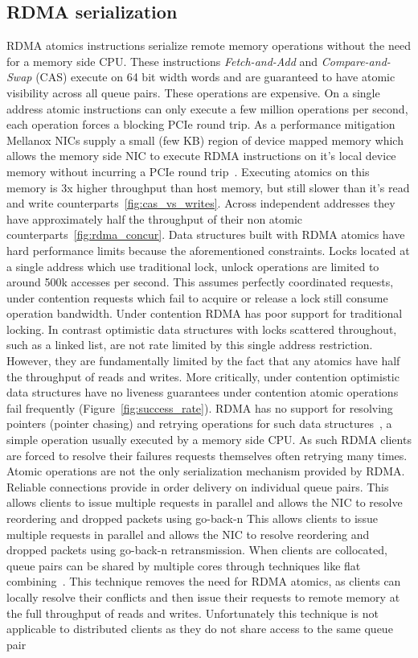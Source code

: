\subsection{RDMA serialization} RDMA atomics instructions
serialize remote memory operations without the need for a
memory side CPU. These instructions \textit{Fetch-and-Add}
and \textit{Compare-and-Swap} (CAS) execute on 64 bit width
words and are guaranteed to have atomic visibility across
all queue pairs. These operations are expensive. On a single
address atomic instructions can only execute a few million
operations per second, each operation forces a blocking PCIe
round trip.  As a performance mitigation Mellanox NICs
supply a small (few KB) region of device mapped memory which
allows the memory side NIC to execute RDMA instructions on
it's local device memory without incurring a PCIe round
trip~\cite{sherman}. Executing atomics on this memory is 3x higher
throughput than host memory, but still slower than it's read
and write counterparts~\ref{fig:cas_vs_writes}.  Across
independent addresses they have approximately half the
throughput of their non atomic
counterparts~\ref{fig:rdma_concur}. 
Data structures built with RDMA atomics have hard
performance limits because the aforementioned constraints.
Locks located at a single address which use traditional
lock, unlock operations are limited to around 500k accesses
per second. This assumes perfectly coordinated requests,
under contention requests which fail to acquire or release a
lock still consume operation bandwidth.
Under contention RDMA has poor support for traditional
locking. In contrast optimistic data structures with locks
scattered throughout, such as a linked list, are not rate
limited by this single address restriction.  However, they
are fundamentally limited by the fact that any atomics have
half the throughput of reads and writes. More critically,
under contention optimistic data structures have no liveness
guarantees under contention atomic operations fail
frequently (Figure~\ref{fig:success_rate}).  RDMA has no
support for resolving pointers (pointer chasing) and
retrying operations for such data structures~\cite{rma,snap,prism}, a
simple operation usually executed by a memory side CPU. As
such RDMA clients are forced to resolve their failures
requests themselves often retrying many times.
Atomic operations are not the only serialization mechanism
provided by RDMA. Reliable connections provide in order
delivery on individual queue pairs. This allows clients to
issue multiple requests in parallel and allows the NIC to
resolve reordering and dropped packets using go-back-n This
allows clients to issue multiple requests in parallel and
allows the NIC to resolve reordering and dropped packets
using go-back-n retransmission. When clients are collocated,
queue pairs can be shared by multiple cores through
techniques like flat combining~\cite{flock,sherman}. This
technique removes the need for RDMA atomics, as clients can
locally resolve their conflicts and then issue their
requests to remote memory at the full throughput of reads
and writes. Unfortunately this technique is not applicable
to distributed clients as they do not share access to the
same queue pair

